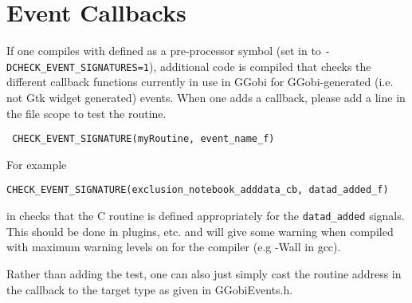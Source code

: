 \documentclass{article}
\begin{document}
\section{Event Callbacks}
If one compiles with  defined as a
pre-processor symbol (set  in
 to \texttt{-DCHECK_EVENT_SIGNATURES=1}),
additional code is compiled that checks the different callback
functions currently in use in GGobi for GGobi-generated (i.e. not Gtk
widget generated) events.
When one adds a callback, please add
a line in the file scope to test the routine.
\begin{verbatim}
 CHECK_EVENT_SIGNATURE(myRoutine, event_name_f)
\end{verbatim}
For example 
\begin{verbatim}
CHECK_EVENT_SIGNATURE(exclusion_notebook_adddata_cb, datad_added_f)
\end{verbatim}
in  checks that the C routine
 is defined appropriately for
the \texttt{datad_added} signals.  This should be done in plugins,
etc.  and will give some warning when compiled with maximum warning
levels on for the compiler (e.g -Wall in gcc).

Rather than adding the test, one can also just simply cast the routine
address in the callback to the target type as given in GGobiEvents.h.
\end{document}
